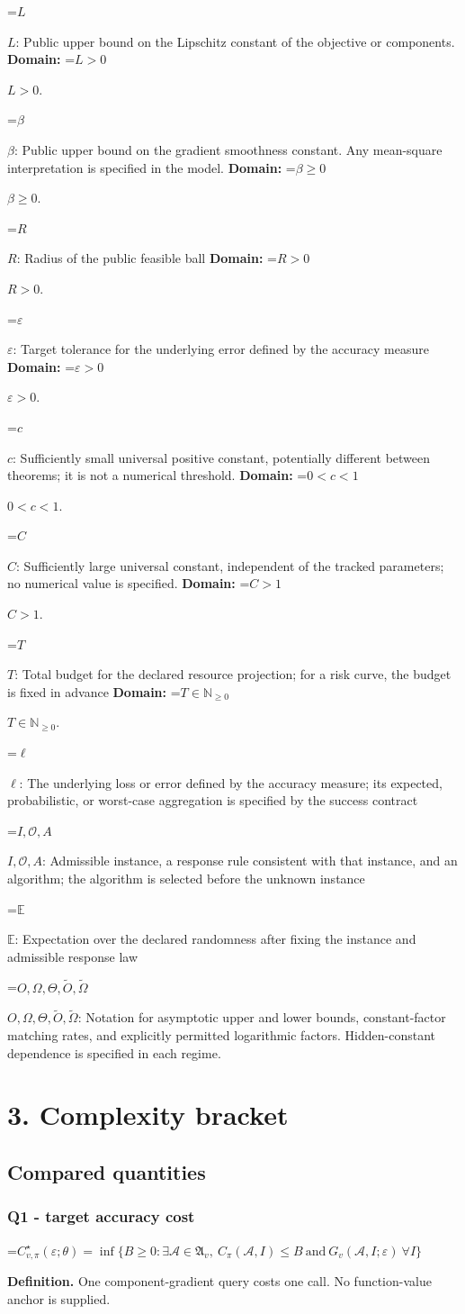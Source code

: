 \documentclass[10pt,a4paper]{article}
\newcommand{\AtlasMath}[1]{\par\begingroup\centering\setbox0=\hbox{$\displaystyle #1$}\ifdim\wd0>1.4\linewidth\typeout{ATLAS WIDE FORMULA: \the\wd0}\fi\ifdim\wd0>\linewidth\resizebox{\linewidth}{!}{\box0}\else\box0\fi\par\endgroup}
\newcommand{\AtlasInlineMath}[1]{\begingroup\setbox0=\hbox{$#1$}\ifdim\wd0>.4\linewidth\endgroup\AtlasMath{#1}\else\endgroup$#1$\fi}
\begin{document}
\AtlasInlineMath{L}: Public upper bound on the Lipschitz constant of the objective or components. \textbf{Domain:} \AtlasInlineMath{L>0}.

\AtlasInlineMath{\beta}: Public upper bound on the gradient smoothness constant. Any mean-square interpretation is specified in the model. \textbf{Domain:} \AtlasInlineMath{\beta\ge0}.

\AtlasInlineMath{R}: Radius of the public feasible ball \textbf{Domain:} \AtlasInlineMath{R>0}.

\AtlasInlineMath{\varepsilon}: Target tolerance for the underlying error defined by the accuracy measure \textbf{Domain:} \AtlasInlineMath{\varepsilon>0}.

\AtlasInlineMath{c}: Sufficiently small universal positive constant, potentially different between theorems; it is not a numerical threshold. \textbf{Domain:} \AtlasInlineMath{0<c<1}.

\AtlasInlineMath{C}: Sufficiently large universal constant, independent of the tracked parameters; no numerical value is specified. \textbf{Domain:} \AtlasInlineMath{C>1}.

\AtlasInlineMath{T}: Total budget for the declared resource projection; for a risk curve, the budget is fixed in advance \textbf{Domain:} \AtlasInlineMath{T\in\mathbb{N}_{\ge0}}.

\AtlasInlineMath{\ell}: The underlying loss or error defined by the accuracy measure; its expected, probabilistic, or worst-case aggregation is specified by the success contract

\AtlasInlineMath{I,\mathcal{O},A}: Admissible instance, a response rule consistent with that instance, and an algorithm; the algorithm is selected before the unknown instance

\AtlasInlineMath{\mathbb{E}}: Expectation over the declared randomness after fixing the instance and admissible response law

\AtlasInlineMath{O,\Omega,\Theta,\widetilde{O},\widetilde\Omega}: Notation for asymptotic upper and lower bounds, constant-factor matching rates, and explicitly permitted logarithmic factors. Hidden-constant dependence is specified in each regime.

\section{3. Complexity bracket}
\subsection{Compared quantities}
\subsubsection{Q1 - target accuracy cost}
\AtlasMath{C^\star_{v,\pi}(\varepsilon;\theta)=\inf\{B\ge0:\exists\mathcal A\in\mathfrak A_v,\ C_\pi(\mathcal A,I)\le B\ \text{and}\ G_v(\mathcal A,I;\varepsilon)\ \forall I\}}
\textbf{Definition.} One component-gradient query costs one call. No function-value anchor is supplied.
\end{document}
